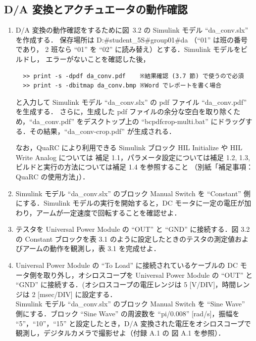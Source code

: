 \subsection{D/A 変換とアクチュエータの動作確認}
\begin{enumerate}
  \item D/A 変換の動作確認をするために図~3.2 の Simulink モデル ``da\_conv.slx'' を作成する．
        保存場所は D:\#student\_5S\#group01\#da （``01'' は班の番号であり，
        2 班なら ``01'' を ``02'' に読み替え）とする．Simulink モデルをビルドし，
        エラーがないことを確認した後，
        \begin{lstlisting}
  >> print -s -dpdf da_conv.pdf    ※結果確認 (3.7 節) で使うので必須
  >> print -s -dbitmap da_conv.bmp ※Word でレポートを書く場合
  \end{lstlisting}
        と入力して Simulink モデル ``da\_conv.slx'' の pdf ファイル ``da\_conv.pdf'' を生成する．
        さらに，生成した pdf ファイルの余分な空白を取り除くため，``da\_conv.pdf'' をデスクトップ上の
        ``bcpdfcrop-multi.bat'' にドラッグする．その結果，``da\_conv-crop.pdf'' が生成される．
        
        なお，QuaRC により利用できる Simulink ブロック HIL Initialize や HIL Write Analog については
        補足 1.1，パラメータ設定については補足 1.2, 1.3, ビルドと実行の方法については補足 1.4 を参照すること
        （別紙「補足事項：QuaRC の使用方法」）．
  \item Simulink モデル “da\_conv.slx” のブロック Manual Switch を “Constant” 側にする．Simulink モデルの実行を開始すると，DC モータに一定の電圧が加わり，アームが一定速度で回転することを確認せよ．
  \item テスタを Universal Power Module の “OUT” と “GND” に接続する．図 3.2 の Constant ブロックを表 3.1 のように設定したときのテスタの測定値およびアームの動作を観測し，表 3.1 を完成せよ．
  \item Universal Power Module の “To Load” に接続されているケーブルの DC モータ側を取り外し，オシロスコープを Universal Power Module の “OUT” と “GND” に接続する．(オシロスコープの電圧レンジは 5 [V/DIV]，時間レンジは 2 [msec/DIV] に設定する．\\
        \quad Simulink モデル “da\_conv.slx” のブロック Manual Switch を “Sine Wave” 側にする．ブロック “Sine Wave” の周波数を “pi/0.008” [rad/s]，振幅を “5”，“10”，“15” と設定したとき，D/A 変換された電圧をオシロスコープで観測し，デジタルカメラで撮影せよ（付録 A.1 の 図 A.1 を参照）．
\end{enumerate}

